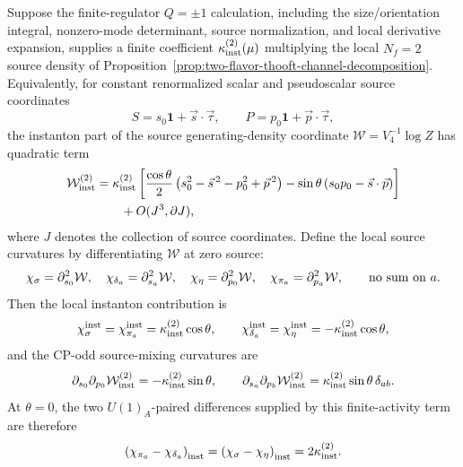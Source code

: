\begin{controlledapproximation}
\label{ca:two-flavor-instanton-source-susceptibility}
Suppose the finite-regulator \(Q=\pm1\) calculation, including the
size/orientation integral, nonzero-mode determinant, source normalization, and
local derivative expansion, supplies a finite coefficient
\(\kappa_{\rm inst}^{(2)}(\mu)\) multiplying the local \(N_f=2\) source density
of Proposition~\ref{prop:two-flavor-thooft-channel-decomposition}.  Equivalently,
for constant renormalized scalar and pseudoscalar source coordinates
\[
  S=s_0\mathbf 1+\vec s\cdot\vec\tau,\qquad
  P=p_0\mathbf 1+\vec p\cdot\vec\tau ,
\]
the instanton part of the source generating-density coordinate
\(\mathcal W=V_4^{-1}\log Z\) has quadratic term
\begin{equation}
\begin{aligned}
  \mathcal W_{\rm inst}^{(2)}
  &=
  \kappa_{\rm inst}^{(2)}
  \left[
    \frac{\cos\theta}{2}
    \left(s_0^2-\vec s^{\,2}-p_0^2+\vec p^{\,2}\right)
    -\sin\theta\left(s_0p_0-\vec s\cdot\vec p\right)
  \right]  \\
  &\qquad
  +O(J^3,\partial J),
\end{aligned}
  \label{eq:two-flavor-instanton-source-curvature-functional}
\end{equation}
where \(J\) denotes the collection of source coordinates.  Define the local
source curvatures by differentiating \(\mathcal W\) at zero source:
\[
  \chi_\sigma=\partial_{s_0}^2\mathcal W,\quad
  \chi_{\delta_a}=\partial_{s_a}^2\mathcal W,\quad
  \chi_\eta=\partial_{p_0}^2\mathcal W,\quad
  \chi_{\pi_a}=\partial_{p_a}^2\mathcal W,
  \qquad\hbox{no sum on }a .
\]
Then the local instanton contribution is
\begin{equation}
  \chi_\sigma^{\rm inst}
  =
  \chi_{\pi_a}^{\rm inst}
  =
  \kappa_{\rm inst}^{(2)}\cos\theta,
  \qquad
  \chi_{\delta_a}^{\rm inst}
  =
  \chi_{\eta}^{\rm inst}
  =
  -\kappa_{\rm inst}^{(2)}\cos\theta ,
  \label{eq:two-flavor-instanton-channel-curvatures}
\end{equation}
and the CP-odd source-mixing curvatures are
\begin{equation}
  \partial_{s_0}\partial_{p_0}\mathcal W_{\rm inst}^{(2)}
  =
  -\kappa_{\rm inst}^{(2)}\sin\theta,
  \qquad
  \partial_{s_a}\partial_{p_b}\mathcal W_{\rm inst}^{(2)}
  =
  \kappa_{\rm inst}^{(2)}\sin\theta\,\delta_{ab}.
  \label{eq:two-flavor-instanton-cp-odd-source-mixing}
\end{equation}
At \(\theta=0\), the two \(U(1)_A\)-paired differences supplied by this
finite-activity term are therefore
\begin{equation}
  \left(\chi_{\pi_a}-\chi_{\delta_a}\right)_{\rm inst}
  =
  \left(\chi_\sigma-\chi_\eta\right)_{\rm inst}
  =
  2\kappa_{\rm inst}^{(2)} .
  \label{eq:two-flavor-instanton-u1a-susceptibility-splitting}
\end{equation}


\end{controlledapproximation}
